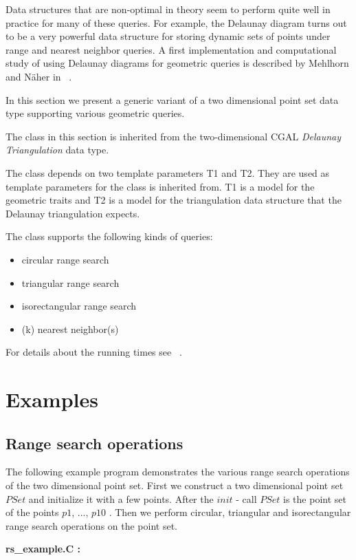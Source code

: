 Data structures that are non-optimal in theory seem to perform quite well in
practice for many of these queries.
For example, the Delaunay diagram turns out to be a very powerful
data structure for storing dynamic sets of points under range and nearest
neighbor queries. A first implementation and computational
study of using Delaunay diagrams for geometric queries is described by
Mehlhorn and N\"aher in ~\cite{LEDAbook}.

In this section we present a generic variant of a two dimensional point set
data type supporting various geometric queries.

The  class in this section is inherited
from the two-dimensional CGAL {\em Delaunay Triangulation} data type.

The  class depends on two template parameters T1 and T2.
They are used as template parameters for the 
class  is inherited from. T1 is a model for the
geometric traits and T2 is a model for the triangulation data structure that the Delaunay triangulation
expects.

The  class supports the following kinds of queries:
\begin{itemize}
\item circular range search
\item triangular range search
\item isorectangular range search
\item (k) nearest neighbor(s)
\end{itemize}
For details about the running times see ~\cite{LEDAbook}.

\section{Examples}

\subsection{Range search operations}

The following example program demonstrates the various range search operations
of the two dimensional point set.
First we construct a two dimensional point set $PSet$ and initialize it with a few points.
After the $init$ - call $PSet$ is the point set of the points $p1$, ..., $p10$ .
Then we perform circular, triangular and isorectangular range search operations on the
point set.

\ccHtmlLinksOff

{\bf rs\_example.C :}


\ccHtmlLinksOn

